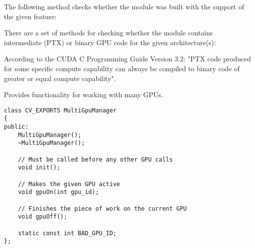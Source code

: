 \bigskip

The following method checks whether the module was built with the support of the given feature:
\begin{description}
\end{description}

There are a set of methods for checking whether the module contains intermediate (PTX) or binary GPU code for the given architecture(s):
\begin{description}
\end{description}


According to the CUDA C Programming Guide Version 3.2: "PTX code produced for some specific compute capability can always be compiled to binary code of greater or equal compute capability". 


Provides functionality for working with many GPUs.

\begin{lstlisting}
class CV_EXPORTS MultiGpuManager
{
public:
    MultiGpuManager();
    ~MultiGpuManager();

    // Must be called before any other GPU calls
    void init();

    // Makes the given GPU active
    void gpuOn(int gpu_id);

    // Finishes the piece of work on the current GPU
    void gpuOff();

    static const int BAD_GPU_ID;
};
\end{lstlisting}


